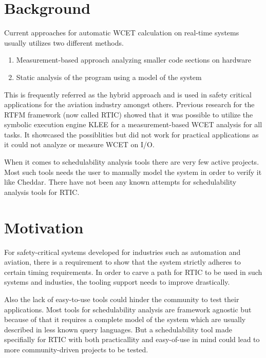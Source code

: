 \section{Background}
Current approaches for automatic WCET calculation on real-time systems usually
utilizes two different methods.
\begin{enumerate}
    \item Measurement-based approach analyzing smaller code sections on hardware
    \item Static analysis of the program using a model of the system
\end{enumerate}
This is frequently referred as the hybrid approach and is used in safety
critical applications for the aviation industry\cite{rapita} amongst others.
Previous research for the RTFM framework (now called RTIC) showed that it was
possible to utilize the symbolic execution engine KLEE for a measurement-based
WCET analysis for all tasks\cite{lindner}. It showcased the possiblities but
did not work for practical applications as it could not analyze or measure WCET
on I/O.

When it comes to schedulability analysis tools there are very few
active projects. Most such tools needs the user to manually model the system in
order to verify it like Cheddar\cite{cheddar}. There have not been any known
attempts for schedulability analysis tools for RTIC.



\section{Motivation}
For safety-critical systems developed for industries such as automation and
aviation, there is a requirement to show that the system strictly adheres to
certain timing requirements. In order to carve a path for RTIC to be used in
such systems and industies, the tooling support needs to improve drastically.

Also the lack of easy-to-use tools could hinder the community to test their
applications. Most tools for schedulability analysis are framework agnostic but
because of that it requires a complete model of the system which are usually
described in less known query languages. But a schedulability tool made
specifially for RTIC with both practicallity and easy-of-use in mind could lead
to more community-driven projects to be tested.

